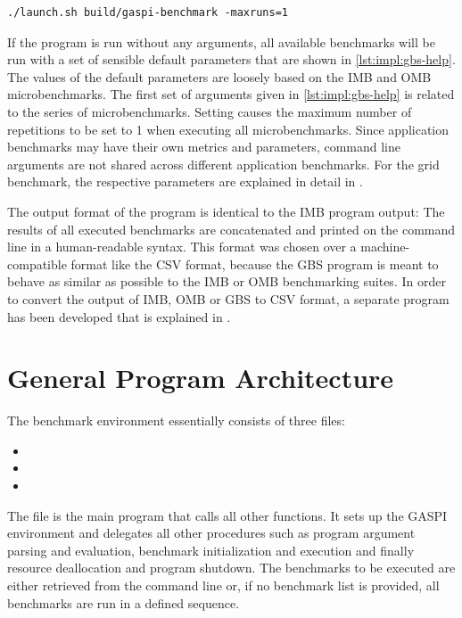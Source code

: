 \begin{lstlisting}[style=console,captionpos={b},caption={Example launch of the \ac{GBS} program.},label=lst:impl:gbs-launch]
./launch.sh build/gaspi-benchmark -maxruns=1
\end{lstlisting}

If the program is run without any arguments, all available benchmarks will be run with a set of sensible default parameters that are shown in \autoref{lst:impl:gbs-help}. The values of the default parameters are loosely based on the \ac{IMB} and \ac{OMB} microbenchmarks. The first set of arguments given in  \autoref{lst:impl:gbs-help} is related to the series of microbenchmarks. Setting \eg {} causes the maximum number of repetitions to be set to 1 when executing all microbenchmarks. Since application benchmarks may have their own metrics and parameters, command line arguments are not shared across different application benchmarks. For the grid benchmark, the respective parameters are explained in detail in .

The output format of the program is identical to the \ac{IMB} program output: The results of all executed benchmarks are concatenated and printed on the command line in a human-readable syntax. This format was chosen over a machine-compatible format like the \ac{CSV} format, because the \ac{GBS} program is meant to behave as similar as possible to the \ac{IMB} or \ac{OMB} benchmarking suites. In order to convert the output of \ac{IMB}, \ac{OMB} or \ac{GBS} to \ac{CSV} format, a separate program has been developed that is explained in .

\section{General Program Architecture}

The benchmark environment essentially consists of three files:
\begin{itemize}
	\item {}
	\item {}
	\item {}
\end{itemize}

The  file is the main program that calls all other functions. It sets up the \ac{GASPI} environment and delegates all other procedures such as program argument parsing and evaluation, benchmark initialization and execution and finally resource deallocation and program shutdown. The benchmarks to be executed are either retrieved from the command line or, if no benchmark list is provided, all benchmarks are run in a defined sequence. 

